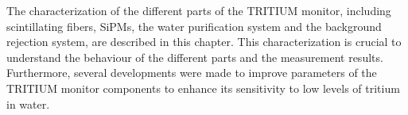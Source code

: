 The characterization of the different parts of the TRITIUM monitor, including scintillating fibers, SiPMs, the water purification system and the background rejection system, are described in this chapter. This characterization is crucial to understand the behaviour of the different parts and the measurement results. Furthermore, several developments were made  to improve parameters of the TRITIUM monitor components to enhance its sensitivity to low levels of tritium in water. %